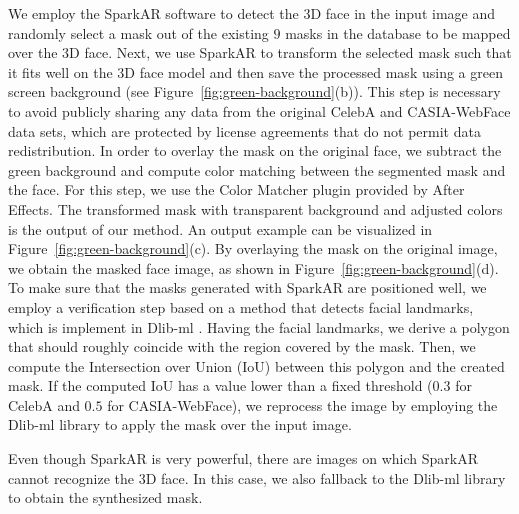 \documentclass{article}
\begin{document}
We employ the SparkAR software to detect the 3D face in the input image and randomly select a mask out of the existing $9$ masks in the database to be mapped over the 3D face.
Next, we use SparkAR to transform the selected mask such that it fits well on the 3D face model and then save the processed mask using a green screen background (see Figure~\ref{fig:green-background}(b)). This step is necessary to avoid publicly sharing any data from the original CelebA and CASIA-WebFace data sets, which are protected by license agreements that do not permit data redistribution. In order to overlay the mask on the original face, we subtract the green background and compute color matching between the segmented mask and the face. For this step, we use the Color Matcher plugin provided by After Effects. The transformed mask with transparent background and adjusted colors is the output of our method. An output example can be visualized in Figure~\ref{fig:green-background}(c). 
By overlaying the mask on the original image, we obtain the masked face image, as shown in Figure~\ref{fig:green-background}(d). To make sure that the masks generated with SparkAR are positioned well, we employ a verification step based on a method that detects facial landmarks, which is implement in Dlib-ml \cite{dlib-ml}. Having the facial landmarks, we derive a polygon that should roughly coincide with the region covered by the mask. Then, we compute the Intersection over Union (IoU) between this polygon and the created mask. If the computed IoU has a value lower than a fixed threshold ($0.3$ for CelebA and $0.5$ for CASIA-WebFace), we reprocess the image by employing the Dlib-ml library to apply the mask over the input image. 


Even though SparkAR is very powerful, there are images on which SparkAR cannot recognize the 3D face. In this case, we also fallback to the Dlib-ml library to obtain the synthesized mask.
\end{document}

